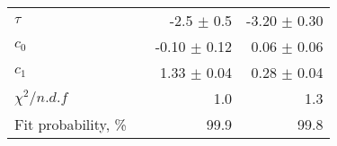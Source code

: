 \begin{table}[H]
{\begin{tabular}{lrrr}


    \rule{0pt}{4ex}$\tau$  && -2.5 $\pm$ 0.5 & -3.20 $\pm$ 0.30 \\
    $c_0$  && -0.10 $\pm$ 0.12 & 0.06 $\pm$ 0.06 \\
    $c_1$  && 1.33 $\pm$ 0.04 & 0.28 $\pm$ 0.04 \\

    \rule{0pt}{4ex}$\chi^2 / n.d.f$  && 1.0 & 1.3 \\
    Fit probability, \%  && 99.9 & 99.8 \\
    \bottomrule
\end{tabular}
}

\label{tab:chib:ups1s:nominal}
\end{table}